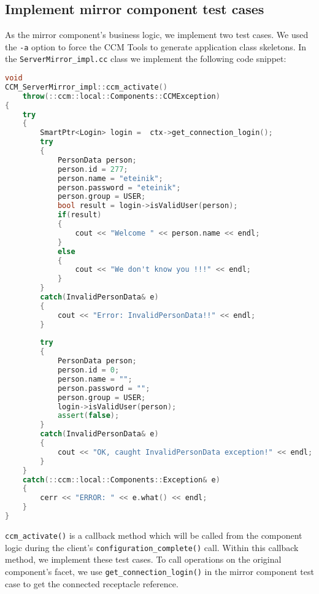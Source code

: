 \subsection{Implement mirror component test cases}
\label{subsection:ImplementMirrorComponentTestCasesCxx}
As the mirror component's business logic, we implement two test cases.
We used the {\tt -a} option to force the CCM Tools to generate application class
skeletons.
In the {\tt ServerMirror\_impl.cc} class we implement the following code snippet:
\begin{footnotesize}
\begin{lstlisting}[language=C++]
void
CCM_ServerMirror_impl::ccm_activate()
    throw(::ccm::local::Components::CCMException)
{
    try
    {
        SmartPtr<Login> login =  ctx->get_connection_login();
        try 
        {
            PersonData person;
            person.id = 277;
            person.name = "eteinik";
            person.password = "eteinik";
            person.group = USER;
            bool result = login->isValidUser(person);
            if(result) 
            {
                cout << "Welcome " << person.name << endl;
            }
            else 
            {
                cout << "We don't know you !!!" << endl;
            }
        }
        catch(InvalidPersonData& e) 
        {
            cout << "Error: InvalidPersonData!!" << endl;
        }
        
        try 
        {
            PersonData person;
            person.id = 0;
            person.name = "";
            person.password = "";
            person.group = USER;      
            login->isValidUser(person);
            assert(false);
        }
        catch(InvalidPersonData& e) 
        {
            cout << "OK, caught InvalidPersonData exception!" << endl;
        }
    }
    catch(::ccm::local::Components::Exception& e)
    {
        cerr << "ERROR: " << e.what() << endl;
    }
}
\end{lstlisting} 
\end{footnotesize}

{\tt ccm\_activate()} is a callback method which will be called from the component 
logic during the client's {\tt configuration\_complete()} call.
Within this callback method, we implement these test cases. 
To call operations on the original component's facet, we use {\tt get\_connection\_login()} 
in the mirror component test case to get the connected receptacle reference. 

